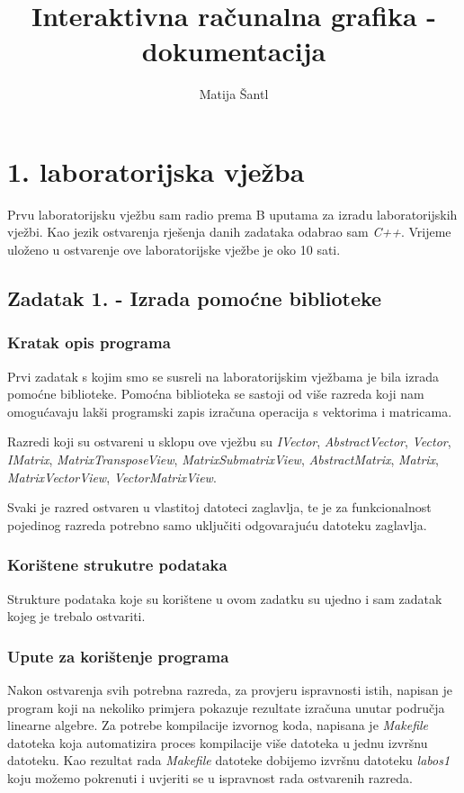 \documentclass{report}
\author{Matija Šantl}
\title{Interaktivna računalna grafika - dokumentacija}
\begin{document}
\maketitle
\tableofcontents

\chapter{1. laboratorijska vježba}
Prvu laboratorijsku vježbu sam radio prema B uputama za izradu laboratorijskih vježbi. Kao jezik ostvarenja rješenja danih zadataka odabrao sam \textit{C++}. Vrijeme uloženo u ostvarenje ove laboratorijske vježbe je oko 10 sati. 

\section{Zadatak 1. - Izrada pomoćne biblioteke}
\subsection{Kratak opis programa}
Prvi zadatak s kojim smo se susreli na laboratorijskim vježbama je bila izrada pomoćne biblioteke. Pomoćna biblioteka se sastoji od više razreda koji nam omogućavaju lakši programski zapis izračuna operacija s vektorima i matricama.

Razredi koji su ostvareni u sklopu ove vježbu su \textit{IVector}, \textit{AbstractVector}, \textit{Vector}, \textit{IMatrix}, \textit{MatrixTransposeView}, \textit{MatrixSubmatrixView}, \textit{AbstractMatrix}, \textit{Matrix}, \textit{MatrixVectorView}, \textit{VectorMatrixView}.

Svaki je razred ostvaren u vlastitoj datoteci zaglavlja, te je za funkcionalnost pojedinog razreda potrebno samo uključiti odgovarajuću datoteku zaglavlja.

\subsection{Korištene strukutre podataka}
Strukture podataka koje su korištene u ovom zadatku su ujedno i sam zadatak kojeg je trebalo ostvariti.

\subsection{Upute za korištenje programa}
Nakon ostvarenja svih potrebna razreda, za provjeru ispravnosti istih, napisan je program koji na nekoliko primjera pokazuje rezultate izračuna unutar područja linearne algebre. Za potrebe kompilacije izvornog koda, napisana je \textit{Makefile} datoteka koja automatizira proces kompilacije više datoteka u jednu izvršnu datoteku. Kao rezultat rada \textit{Makefile} datoteke dobijemo izvršnu datoteku \textit{labos1} koju možemo pokrenuti i uvjeriti se u ispravnost rada ostvarenih razreda.
\end{document}
